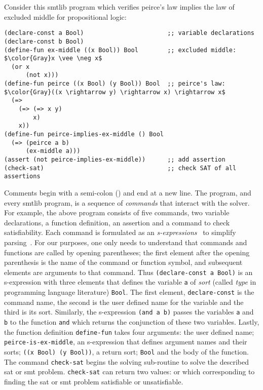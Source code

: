 Consider this \acl{smtlib} program which verifies peirce's law implies the law
of excluded middle for propositional logic:
%
\begin{lstlisting}[columns=flexible,keepspaces=true,language=SMTLIB]
(declare-const a Bool)                       ;; variable declarations
(declare-const b Bool)
(define-fun ex-middle ((x Bool)) Bool        ;; excluded middle: $\color{Gray}x \vee \neg x$
  (or x
      (not x)))
(define-fun peirce ((x Bool) (y Bool)) Bool  ;; peirce's law: $\color{Gray}((x \rightarrow y) \rightarrow x) \rightarrow x$
  (=>
    (=> (=> x y)
        x)
    x))
(define-fun peirce-implies-ex-middle () Bool
  (=> (peirce a b)
      (ex-middle a)))
(assert (not peirce-implies-ex-middle))      ;; add assertion
(check-sat)                                  ;; check SAT of all assertions
\end{lstlisting}
%
Comments begin with a semi-colon (\rn{;}) and end at a new line. The program,
and every \acl{smtlib} program, is a sequence of \emph{commands} that interact
with the solver. For example, the above program consists of five commands, two
variable declarations, a function definition, an assertion and a command to
check satisfiability. Each command is formulated as an
\emph{s-expressions}~\cite{10.1145/367177.367199} to simplify
parsing~\cite{BarFT-SMTLIB}. For our purposes, one only needs to understand that
commands and functions are called by opening parentheses; the first element
after the opening parenthesis is the name of the command or function symbol, and
subsequent elements are arguments to that command. Thus
\lstinline{(declare-const a Bool)} is an s-expression with three elements that
defines the \pl{} variable \lstinline{a} of \emph{sort} (called \emph{type} in
programming language literature) \lstinline{Bool}. The first element,
\lstinline{declare-const} is the command name, the second is the user defined
name for the variable and the third is its sort. Similarly, the s-expression
\lstinline{(and a b)} passes the variables \lstinline{a} and \lstinline{b} to
the function \lstinline{and} which returns the conjunction of these two
variables. Lastly, the function definition \lstinline{define-fun} takes four
arguments: the user defined name; \lstinline{peirce-is-ex-middle}, an
s-expression that defines argument names and their sorts;
\lstinline{((x Bool) (y Bool))}, a return sort; \lstinline{Bool} and the body of
the function. The command \lstinline{check-sat} begins the solving sub-routine
to solve the described \ac{sat} or \ac{smt} problem. \lstinline{check-sat} can
return two values:  or  which corresponding to finding the
\ac{sat} or \ac{smt} problem satisfiable or unsatisfiable.

